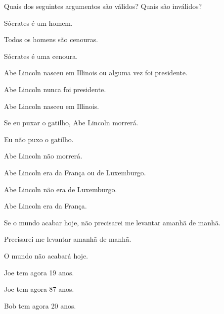 \practiceproblems
\problempart
Quais dos seguintes argumentos são válidos? Quais são inválidos?
\begin{compactlist}
\item
\begin{earg}
\item Sócrates é um homem.
\item Todos os homens são cenouras.
\item[\texttherefore] Sócrates é uma cenoura.
\end{earg}
\item
\begin{earg}
\item Abe Lincoln nasceu em Illinois ou alguma vez foi presidente.
\item Abe Lincoln nunca foi presidente.
\item[\texttherefore] Abe Lincoln nasceu em Illinois.
\end{earg}
\item
\begin{earg}
\item Se eu puxar o gatilho, Abe Lincoln morrerá.
\item Eu não puxo o gatilho.
\item[\texttherefore] Abe Lincoln não morrerá.
\end{earg}
\item
\begin{earg}
\item Abe Lincoln era da França ou de Luxemburgo.
\item Abe Lincoln não era de Luxemburgo.
\item[\texttherefore] Abe Lincoln era da França.
\end{earg}
\item
\begin{earg}
\item Se o mundo acabar hoje, não precisarei me levantar amanhã de manhã.
\item Precisarei me levantar amanhã de manhã.
\item[\texttherefore] O mundo não acabará hoje.
\end{earg}
\item
\begin{earg}
\item Joe tem agora 19 anos.
\item Joe tem agora 87 anos.
\item[\texttherefore] Bob tem agora 20 anos.
\end{earg}
\end{compactlist}

